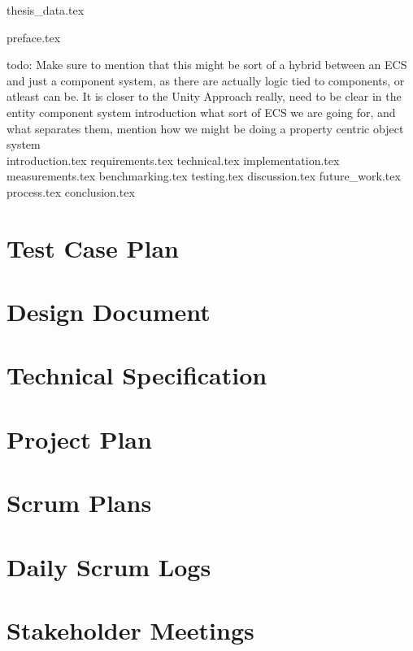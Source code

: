 \documentclass[BSP,english,oneside]{ntnuthesis/ntnubachelorthesis}
\newcommand{\todo}[1]{{\color{cyan}\lbrack todo: #1\rbrack}\\} %
\begin{document}
{thesis_data.tex}

\makefrontpages

{preface.tex}

\tableofcontents
\listoffigures
\listoftables

\todo{Make sure to mention that this might be sort of a hybrid between an ECS and just a component system,
as there are actually logic tied to components, or atleast can be. It is closer to the Unity Approach really,
need to be clear in the entity component system introduction what sort of ECS we are going for,
and what separates them, mention how we might be doing a property centric object system}

{introduction.tex}
{requirements.tex}
{technical.tex}
{implementation.tex}
{measurements.tex}
{benchmarking.tex}
{testing.tex}
{discussion.tex}
{future_work.tex}
{process.tex}
{conclusion.tex}




\appendix %
\chapter{Test Case Plan}
\chapter{Design Document}
\chapter{Technical Specification}
\chapter{Project Plan}
\chapter{Scrum Plans}
\chapter{Daily Scrum Logs}
\chapter{Stakeholder Meetings}
\end{document}
